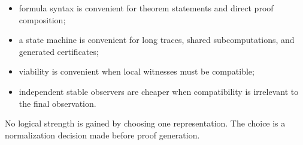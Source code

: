 \begin{itemize}
\item formula syntax is convenient for theorem statements and direct proof
composition;
\item a state machine is convenient for long traces, shared subcomputations,
and generated certificates;
\item viability is convenient when local witnesses must be compatible;
\item independent stable observers are cheaper when compatibility is irrelevant
to the final observation.
\end{itemize}

No logical strength is gained by choosing one representation.  The choice is a
normalization decision made before proof generation.
